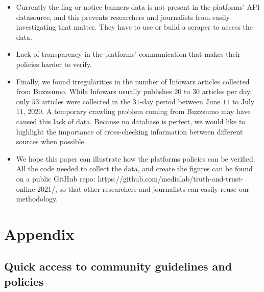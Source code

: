 \documentclass{article}
\begin{document}
{\begin{itemize}
	\item Currently the flag or notice banners data is not present in the platforms’ API datasource, and this prevents researchers and journalists from easily investigating that matter. They have to use or build a scraper to access the data.

	\item Lack of transparency in the platforms’ communication that makes their policies harder to verify.

	\item Finally, we found irregularities in the number of Infowars articles collected from Buzzsumo. While Infowars usually publishes $20$ to $30$ articles per day, only $53$ articles were collected in the $31$-day period between June $11$ to July $11$, 2020. A temporary crawling problem coming from Buzzsumo may have caused this lack of data. Because no database is perfect, we would like to highlight the importance of cross-checking information between different sources when possible. 
	
	\item We hope this paper can illustrate how the platforms policies can be verified. All the code needed to collect the data, and create the figures can be found on a public GitHub repo: https://github.com/medialab/truth-and-trust-online-2021/, so that other researchers and journalists can easily reuse our methodology. 
\end{itemize}
}


 

{}


\newpage 

\section{Appendix}

\subsection{Quick access to community guidelines and policies} \label{links}
\end{document}
